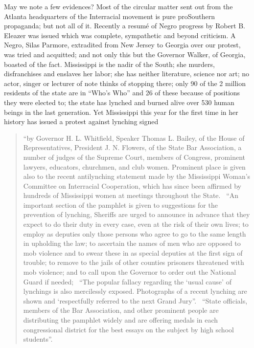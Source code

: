 \documentclass[letterpaper,10pt,english]{jupyterBook}
\begin{document}
\sphinxAtStartPar
May we note a few evidences? Most of the circular matter sent out from the Atlanta headquarters of the Inter\sphinxhyphen{}racial movement is pure pro\sphinxhyphen{}Southern propaganda; but not all of it. Recently a resumé of Negro progress by Robert B. Eleazer was issued which was complete, sympathetic and beyond criticism. A Negro, Silas Parmore, extradited from New Jersey to Georgia over our protest, was tried and acquitted; and not only this but the Governor Walker, of Georgia, boasted of the fact. Mississippi is the nadir of the South; she murders, disfranchises and enslaves her labor; she has neither literature, science nor art; no actor, singer or lecturer of note thinks of stopping there; only 90 of the 2 million residents of the state are in “Who’s Who” and 26 of these because of positions they were elected to; the state has lynched and burned alive over 530 human beings in the last generation. Yet Mississippi this year for the first time in her history has issued a protest against lynching signed
\begin{quote}

\sphinxAtStartPar
“by Governor H. L. Whitfield, Speaker Thomas L. Bailey, of the House of Representatives, President J. N. Flowers, of the State Bar Association, a number of judges of the Supreme Court, members of Congress, prominent lawyers, educators, churchmen, and club women. Prominent place is given also to the recent anti\sphinxhyphen{}lynching statement made by the Mississippi Woman’s Committee on Interracial Cooperation, which has since been affirmed by hundreds of Mississippi women at meetings throughout the State.
 “An important section of the pamphlet is given to suggestions for the prevention of lynching, Sheriffs are urged to announce in advance that they expect to do their duty in every case, even at the risk of their own lives; to employ as deputies only those persons who agree to go to the same length in upholding the law; to ascertain the names of men who are opposed to mob violence and to swear these in as special deputies at the first sign of trouble; to remove to the jails of other counties prisoners threatened with mob violence; and to call upon the Governor to order out the National Guard if needed;
 “The popular fallacy regarding the ‘usual cause’ of lynchings is also mercilessly exposed. Photographs of a recent lynching are shown and ‘respectfully referred to the next Grand Jury”.
 “State officials, members of the Bar Association, and other prominent people are distributing the pamphlet widely and are offering medals in each congressional district for the best essays on the subject by high school students”.
\end{quote}
\end{document}
